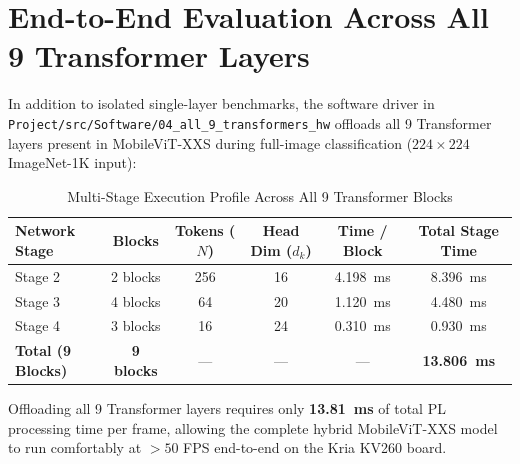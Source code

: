 \section{End-to-End Evaluation Across All 9 Transformer Layers}
In addition to isolated single-layer benchmarks, the software driver in \texttt{Project/src/Software/04\_all\_9\_transformers\_hw} offloads all 9 Transformer layers present in MobileViT-XXS during full-image classification ($224 \times 224$ ImageNet-1K input):
\begin{table}[htbp]
    \centering
    \caption{Multi-Stage Execution Profile Across All 9 Transformer Blocks}
    \label{tab:all_9_transformers}
    \begin{tabular}{l c c c c c}
        \toprule
        \textbf{Network Stage} & \textbf{Blocks} & \textbf{Tokens ($N$)} & \textbf{Head Dim ($d_k$)} & \textbf{Time / Block} & \textbf{Total Stage Time} \\
        \midrule
        Stage 2 & 2 blocks & 256 & 16 & 4.198~ms & 8.396~ms \\
        Stage 3 & 4 blocks & 64  & 20 & 1.120~ms & 4.480~ms \\
        Stage 4 & 3 blocks & 16  & 24 & 0.310~ms & 0.930~ms \\
        \midrule
        \textbf{Total (9 Blocks)} & \textbf{9 blocks} & — & — & — & \textbf{13.806~ms} \\
        \bottomrule
    \end{tabular}
\end{table}

Offloading all 9 Transformer layers requires only \textbf{13.81~ms} of total PL processing time per frame, allowing the complete hybrid MobileViT-XXS model to run comfortably at $> 50$ FPS end-to-end on the Kria KV260 board.

